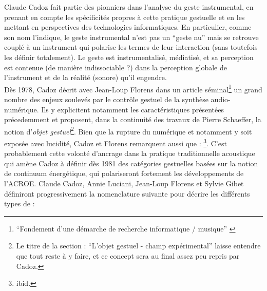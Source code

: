 \noindent Claude Cadoz fait partie des pionniers dans l'analyse du geste instrumental, en prenant en compte les spécificités propres à cette pratique gestuelle et en les mettant en perspectives des technologies informatiques. En particulier, comme son nom l'indique, le geste instrumental n'est pas un ``geste nu'' mais se retrouve couplé à un instrument qui polarise les termes de leur interaction (sans toutefois les définir totalement). Le geste est instrumentalisé, médiatisé, et sa perception est contenue (de manière indissociable ?) dans la perception globale de l'instrument et de la réalité (sonore) qu'il engendre.\\
\indent Dès 1978, Cadoz décrit avec Jean-Loup Florens dans un article séminal\footnote{``Fondement d’une démarche de recherche informatique / musique'' \cite{cadoz_fondement_1978}} un grand nombre des  enjeux soulevés par le contrôle gestuel de la synthèse audio-numérique. Ils y explicitent notamment les caractéristiques présentées précedemment et proposent, dans la continuité des travaux de Pierre Schaeffer, la notion d'\textit{objet gestuel}\footnote{Le titre de la section : ``L'objet gestuel - champ expérimental'' laisse entendre que tout reste à y faire, et ce concept sera au final assez peu repris par Cadoz.}. Bien que la rupture du numérique et notamment  y soit exposée avec lucidité, Cadoz et Florens remarquent aussi que : \footnote{ibid.}. C'est probablement cette volonté d'ancrage dans la pratique traditionnelle acoustique qui amène Cadoz à définir dès 1981 \cite{cadoz_synthese_1981} des catégories gestuelles basées sur la notion de continuum énergétique, qui polariseront fortement les développements de l'\gls{ACROE}. Claude Cadoz, Annie Luciani, Jean-Loup Florens et Sylvie Gibet définiront progressivement la nomenclature suivante pour décrire les différents types de  :
\vspace{-1em}
